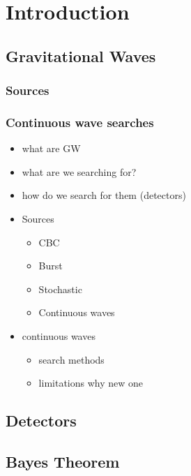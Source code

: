 \chapter{Introduction}


\section{Gravitational Waves}

\subsection{Sources}

\subsection{Continuous wave searches}
\begin{itemize}
    \item what are GW
    \item what are we searching for?
    \item how do we search for them (detectors)
    \item Sources
    \begin{itemize}
        \item CBC
        \item Burst
        \item Stochastic
        \item Continuous waves
    \end{itemize}
    \item continuous waves 
    \begin{itemize}
        \item search methods 
        \item limitations why new one
    \end{itemize}
\end{itemize}


\section{Detectors}

\section{Bayes Theorem}

